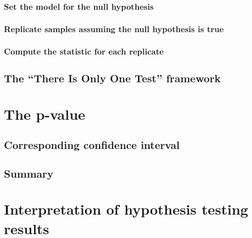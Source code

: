 \documentclass[
  12pt, krantz2,
]{krantz}
\begin{document}
\hypertarget{set-the-model-for-the-null-hypothesis}{%
\subsubsection*{Set the model for the null hypothesis}\label{set-the-model-for-the-null-hypothesis}}


\hypertarget{replicate-samples-assuming-the-null-hypothesis-is-true}{%
\subsubsection*{Replicate samples assuming the null hypothesis is true}\label{replicate-samples-assuming-the-null-hypothesis-is-true}}


\hypertarget{compute-the-statistic-for-each-replicate}{%
\subsubsection*{Compute the statistic for each replicate}\label{compute-the-statistic-for-each-replicate}}


\hypertarget{only-one-test}{%
\subsection{The ``There Is Only One Test'' framework}\label{only-one-test}}

\hypertarget{p-value}{%
\section{The p-value}\label{p-value}}

\hypertarget{corresponding-confidence-interval}{%
\subsection{Corresponding confidence interval}\label{corresponding-confidence-interval}}

\hypertarget{summary-5}{%
\subsection{Summary}\label{summary-5}}

\hypertarget{ht-interpretation}{%
\section{Interpretation of hypothesis testing results}\label{ht-interpretation}}
\end{document}
